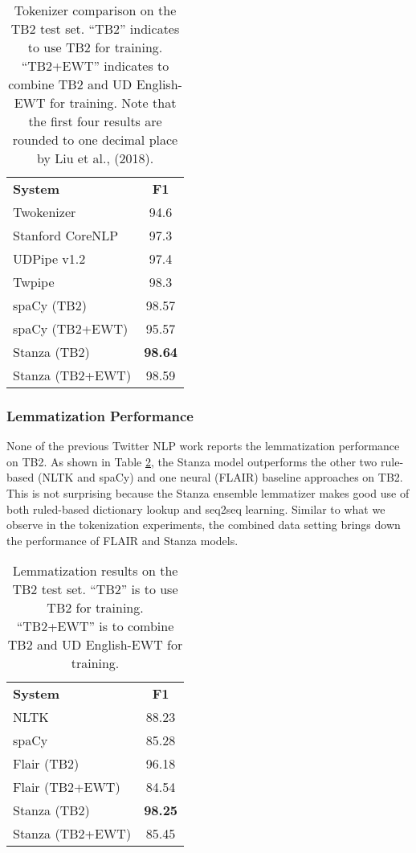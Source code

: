 \documentclass[10pt, a4paper]{article}
\begin{document}
\begin{table}[h]
\centering
\begin{tabular}{l|c}
\textbf{System} & \textbf{F1}\\ \Xhline{2\arrayrulewidth}
Twokenizer& 94.6\\
Stanford CoreNLP& 97.3\\
UDPipe v1.2 & 97.4\\
Twpipe& 98.3\\\hline
spaCy (TB2) & 98.57 \\
spaCy (TB2+EWT) & 95.57 \\
\hline
Stanza (TB2) & \textbf{98.64}\\
Stanza (TB2+EWT)& 98.59 \\


\end{tabular}
\caption{Tokenizer comparison on the TB2 test set. ``TB2'' indicates to use TB2 for training. ``TB2+EWT'' indicates to combine TB2 and UD English-EWT for training. Note that the first four results are rounded to one decimal place by Liu et al., (2018). }
\label{tab:tokenization}
\end{table}


\subsubsection{Lemmatization Performance}

 None of the previous Twitter NLP work reports the lemmatization performance on TB2. As shown in Table \ref{tab:lemmatization}, the Stanza model outperforms the other two rule-based (NLTK and spaCy) and one neural (FLAIR) baseline approaches on TB2. This is not surprising because the Stanza ensemble lemmatizer makes good use of both ruled-based dictionary lookup and seq2seq learning. Similar to what we observe in the tokenization experiments, the combined data setting brings down the performance of FLAIR and Stanza models. 




\begin{table}[h]
\centering
\begin{tabular}{l|c}
\textbf{System} & \textbf{F1} \\ \Xhline{2\arrayrulewidth}
NLTK& 88.23 \\
spaCy & 85.28 \\
Flair (TB2) & 96.18 \\
Flair (TB2+EWT) & 84.54 \\
\hline
Stanza (TB2) & \textbf{\textbf{98.25}}\\
Stanza (TB2+EWT)& 85.45
\end{tabular}
\caption{Lemmatization results on the TB2 test set. ``TB2'' is to use TB2 for training. ``TB2+EWT'' is to combine TB2 and UD English-EWT for training.}
\label{tab:lemmatization}
\end{table}
\end{document}
